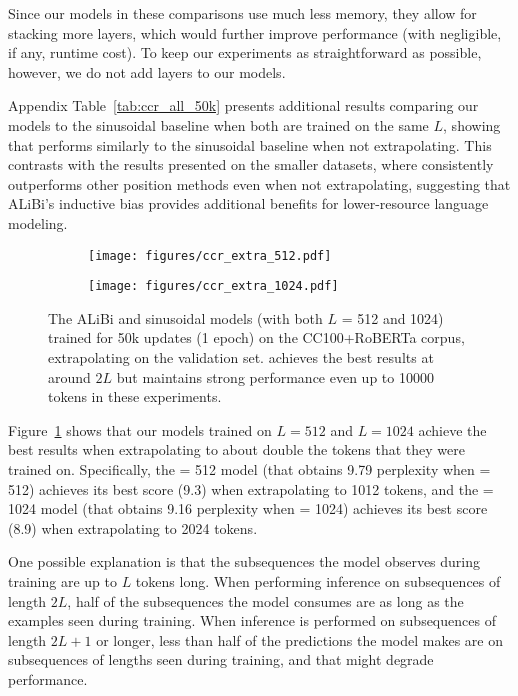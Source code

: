 Since our models in these comparisons use much less memory, they allow for stacking more layers, which would further improve performance (with negligible, if any, runtime cost). To keep our experiments as straightforward as possible, however, we do not add layers to our models.

Appendix Table~\ref{tab:ccr_all_50k} presents additional results comparing our models to the sinusoidal baseline when both are trained on the same $L$, showing that \al performs similarly to the sinusoidal baseline when not extrapolating. This contrasts with the  results presented on the smaller datasets, where \al consistently outperforms other position methods even when not extrapolating, suggesting that ALiBi's inductive bias provides additional benefits for lower-resource language modeling.

\begin{figure}[h]
\centering
\begin{subfigure}{.45\textwidth}  %
  \centering
  \texttt{[image: figures/ccr\_extra\_512.pdf]}
\end{subfigure}%
\begin{subfigure}{.45\textwidth} %
  \centering
  \texttt{[image: figures/ccr\_extra\_1024.pdf]}
\end{subfigure}
\caption{The ALiBi and sinusoidal models (with both $L$ = 512 and 1024) trained for 50k updates (1 epoch) on the CC100+RoBERTa corpus, extrapolating on the validation set. %
\al achieves the best results at around $2L$ but maintains strong performance even up to 10000 tokens in these experiments.}
\label{fig:ccr_extra}
\end{figure}

Figure~\ref{fig:ccr_extra} shows that our models trained on $L=512$ and $L=1024$ achieve the best results when extrapolating to about double the tokens that they were trained on.
Specifically, the \lt = 512 model (that obtains 9.79 perplexity when \li = 512) achieves its best score (9.3) when extrapolating to 1012 tokens, and the \lt = 1024 model (that obtains 9.16 perplexity when \li = 1024) achieves its best score (8.9) when extrapolating to 2024 tokens. 

One possible explanation is that the subsequences the model observes during training are up to $L$ tokens long. When performing inference on subsequences of length $2L$, half of the subsequences the model consumes are as long as the examples seen during training. When inference is performed on subsequences of length $2L+1$ or longer, less than half of the predictions the model makes are on subsequences of lengths seen during training, and that might degrade performance. 

